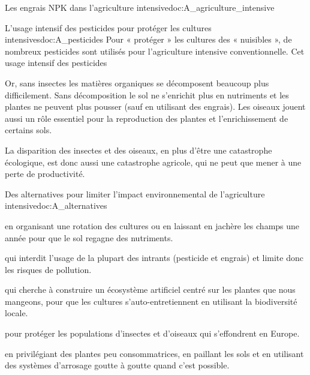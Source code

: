 \begin{doc}{Les engrais NPK dans l'agriculture intensive}{doc:A_agriculture_intensive}
\end{doc}

\begin{doc}{L'usage intensif des pesticides pour protéger les cultures intensives}{doc:A_pesticides}
  Pour « protéger » les cultures des « nuisibles », de nombreux pesticides sont utilisés pour l'agriculture intensive conventionnelle.
  Cet usage intensif des pesticides 

  Or, sans insectes les matières organiques se décomposent beaucoup plus difficilement.
  Sans décomposition le sol ne s'enrichit plus en nutriments et les plantes ne peuvent plus pousser (sauf en utilisant des engrais).
  Les oiseaux jouent aussi un rôle essentiel pour la reproduction des plantes et l'enrichissement de certains sols. 

  La disparition des insectes et des oiseaux, en plus d'être une catastrophe écologique, est donc aussi une catastrophe agricole, qui ne peut que mener à une perte de productivité.%
\end{doc}

\begin{doc}{Des alternatives pour limiter l'impact environnemental de l'agriculture intensive}{doc:A_alternatives}
  \begin{listePoints}
    \item {} en organisant une rotation des cultures ou en laissant en jachère les champs une année pour que le sol regagne des nutriments.
    \item {} qui interdit l'usage de la plupart des intrants (pesticide et engrais) et limite donc les risques de pollution.
    \item {} qui cherche à construire un écosystème artificiel centré sur les plantes que nous mangeons, pour que les cultures s'auto-entretiennent en utilisant la biodiversité locale.
    \item {} pour protéger les populations d'insectes et d'oiseaux qui s'effondrent en Europe.
    \item {} en privilégiant des plantes peu consommatrices, en paillant les sols et en utilisant des systèmes d'arrosage goutte à goutte quand c'est possible.
  \end{listePoints}
\end{doc}
